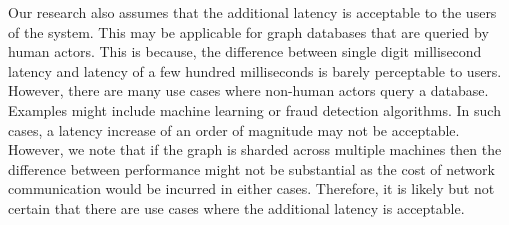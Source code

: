 \smallskip
Our research also assumes that the additional latency is acceptable to
the users of the system. This may be applicable for graph databases that are
queried by human actors. This is because, the difference between single digit
millisecond latency and latency of a few hundred milliseconds is barely
perceptable to users. However, there are many use cases where non-human actors
query a database. Examples might include machine learning or fraud detection
algorithms. In such cases, a latency increase of an order of magnitude may not
be acceptable. However, we note that if the graph is sharded across multiple
machines then the difference between performance might not be substantial as the
cost of network communication would be incurred in either cases. Therefore, it
is likely but not certain that there are use cases where the additional latency
is acceptable.
